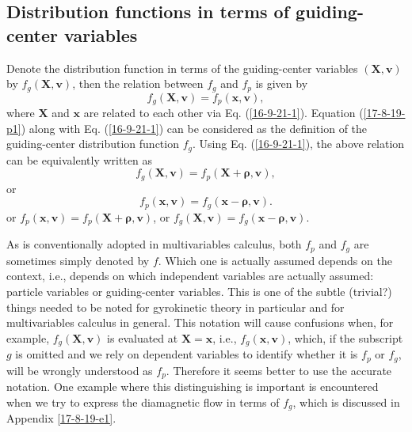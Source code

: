 \documentclass{article}
\newcommand{\tmmathbf}[1]{\ensuremath{\boldsymbol{#1}}}
\begin{document}
\subsection{Distribution functions in terms of guiding-center variables}

Denote the distribution function in terms of the guiding-center variables
$(\mathbf{X}, \mathbf{v})$ by $f_g (\mathbf{X}, \mathbf{v})$, then the
relation between $f_g$ and $f_p$ is given by
\begin{equation}
  \label{17-8-19-p1} f_g (\mathbf{X}, \mathbf{v}) = f_p (\mathbf{x},
  \mathbf{v}),
\end{equation}
where $\mathbf{X}$ and $\mathbf{x}$ are related to each other via Eq.
(\ref{16-9-21-1}). Equation (\ref{17-8-19-p1}) along with Eq.
(\ref{16-9-21-1}) can be considered as the definition of the guiding-center
distribution function $f_g$. Using Eq. (\ref{16-9-21-1}), the above relation
can be equivalently written as
\begin{equation}
  \label{17-5-15-p11} f_g (\mathbf{X}, \mathbf{v}) = f_p
  (\mathbf{X}+\tmmathbf{\rho}, \mathbf{v}),
\end{equation}
or
\begin{equation}
  \label{17-8-19-p3} f_p (\mathbf{x}, \mathbf{v}) = f_g
  (\mathbf{x}-\tmmathbf{\rho}, \mathbf{v}) .
\end{equation}
or $f_p (\mathbf{x}, \mathbf{v}) = f_p (\mathbf{X}+\tmmathbf{\rho},
\mathbf{v})$, or $f_g (\mathbf{X}, \mathbf{v}) = f_g
(\mathbf{x}-\tmmathbf{\rho}, \mathbf{v})$.

As is conventionally adopted in multivariables calculus, both $f_p$ and $f_g$
are sometimes simply denoted by $f$. Which one is actually assumed depends on
the context, i.e., depends on which independent variables are actually
assumed: particle variables or guiding-center variables. This is one of the
subtle (trivial?) things needed to be noted for gyrokinetic theory in
particular and for multivariables calculus in general. This notation will
cause confusions when, for example, $f_g (\mathbf{X}, \mathbf{v})$ is
evaluated at $\mathbf{X}=\mathbf{x}$, i.e., $f_g (\mathbf{x}, \mathbf{v})$,
which, if the subscript $g$ is omitted and we rely on dependent variables to
identify whether it is $f_p$ or $f_g$, will be wrongly understood as $f_p$.
Therefore it seems better to use the accurate notation. One example where this
distinguishing is important is encountered when we try to express the
diamagnetic flow in terms of $f_g$, which is discussed in Appendix
\ref{17-8-19-e1}.
\end{document}
